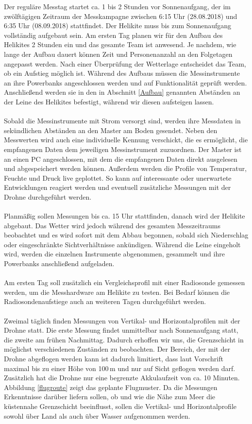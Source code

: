 \documentclass[a4paper,11pt,DIV=calc,tablecaptionabove,headinclude,twoside]{article}
\begin{document}
Der reguläre Messtag startet ca. 1 bis 2 Stunden vor Sonnenaufgang, der im zwölftägigen Zeitraum der Messkampagne zwischen 6:15 Uhr (28.08.2018) und 6:35 Uhr (08.09.2018) stattfindet. Der Helikite muss bis zum Sonnenaufgang vollständig aufgebaut sein. Am ersten Tag planen wir für den Aufbau des Helikites 2 Stunden ein und das gesamte Team ist anwesend. Je nachdem, wie lange der Aufbau dauert können Zeit und Personenanzahl an den Folgetagen angepasst werden. Nach einer Überprüfung der Wetterlage entscheidet das Team, ob ein Aufstieg möglich ist. Während des Aufbaus müssen die Messinstrumente an ihre Powerbanks angeschlossen werden und auf Funktionalität geprüft werden. Anschließend werden sie in den in Abschnitt \ref{Aufbau} genannten Abständen an der Leine des Helikites befestigt, während wir diesen aufsteigen lassen. \\\\
Sobald die Messinstrumente mit Strom versorgt sind, werden ihre Messdaten in sekündlichen Abständen an den Master am Boden gesendet. Neben den Messwerten wird auch eine individuelle Kennung verschickt, die es ermöglicht, die empfangenen Daten dem jeweiligen Messinstrument zuzuordnen. Der Master ist an einen PC angeschlossen, mit dem die empfangenen Daten direkt ausgelesen und abgespeichert werden können. Außerdem werden die Profile von Temperatur, Feuchte und Druck live geplottet. So kann auf interessante oder unerwartete Entwicklungen reagiert werden und eventuell zusätzliche Messungen mit der Drohne durchgeführt  werden.\\\\
Planmäßig sollen Messungen bis ca. 15 Uhr stattfinden, danach wird der Helikite abgebaut. Das Wetter wird jedoch während des gesamten Messzeitraums beobachtet und es wird sofort mit dem Abbau begonnen, sobald sich Niederschlag oder eingeschränkte Sichtverhältnisse ankündigen. Während die Leine eingeholt wird, werden die einzelnen Instrumente abgenommen, gesammelt und ihre Powerbanks anschließend aufgeladen. \\\\
Am ersten Tag soll zusätzlich ein Vergleichsprofil mit einer Radiosonde gemessen werden, um die Messhardware am Helikite zu testen. Bei Bedarf können die Radiosondenaufstiege auch an weiteren Tagen durchgeführt werden.\\\\
Zweimal täglich finden Messungen von Vertikal- und Horizontalprofilen mit der Drohne statt. Die erste Messung findet unmittelbar nach Sonnenaufgang statt, die zweite am frühen Nachmittag. Dadurch erhoffen wir uns, die Grenzschicht in möglichst verschiedenen Zuständen zu beobachten. Der Bereich, der mit der Drohne abgeflogen werden kann ist dadurch limitiert, dass laut Vorschrift maximal bis zu einer Höhe von 100\,m und nur auf Sicht geflogen werden darf. Zusätzlich hat die Drohne nur eine begrenzte Akkulaufzeit von ca. 10 Minuten. Abbildung \ref{flugroute} zeigt das geplante Flugmuster. Da die Messungen Erkenntnisse darüber liefern sollen, ob und wie die Nähe zum Meer die küstennahe Grenzschicht beeinflusst, sollen die Vertikal- und Horizontalprofile sowohl über Land als auch über Wasser aufgenommen werden. \\\\
\end{document}
